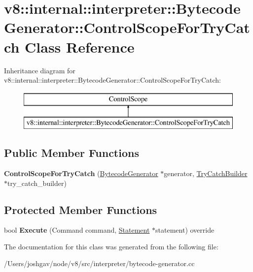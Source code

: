 \hypertarget{classv8_1_1internal_1_1interpreter_1_1_bytecode_generator_1_1_control_scope_for_try_catch}{}\section{v8\+:\+:internal\+:\+:interpreter\+:\+:Bytecode\+Generator\+:\+:Control\+Scope\+For\+Try\+Catch Class Reference}
\label{classv8_1_1internal_1_1interpreter_1_1_bytecode_generator_1_1_control_scope_for_try_catch}
Inheritance diagram for v8\+:\+:internal\+:\+:interpreter\+:\+:Bytecode\+Generator\+:\+:Control\+Scope\+For\+Try\+Catch\+:\begin{figure}[H]
\begin{center}
\leavevmode
\includegraphics[height=2.000000cm]{classv8_1_1internal_1_1interpreter_1_1_bytecode_generator_1_1_control_scope_for_try_catch}
\end{center}
\end{figure}
\subsection*{Public Member Functions}
\begin{DoxyCompactItemize}
\item 
{\bfseries Control\+Scope\+For\+Try\+Catch} (\hyperlink{classv8_1_1internal_1_1interpreter_1_1_bytecode_generator}{Bytecode\+Generator} $\ast$generator, \hyperlink{classv8_1_1internal_1_1interpreter_1_1_try_catch_builder}{Try\+Catch\+Builder} $\ast$try\+\_\+catch\+\_\+builder)\hypertarget{classv8_1_1internal_1_1interpreter_1_1_bytecode_generator_1_1_control_scope_for_try_catch_a55f86d5cd0c6b4be2abbdf58fac2a5e3}{}\label{classv8_1_1internal_1_1interpreter_1_1_bytecode_generator_1_1_control_scope_for_try_catch_a55f86d5cd0c6b4be2abbdf58fac2a5e3}

\end{DoxyCompactItemize}
\subsection*{Protected Member Functions}
\begin{DoxyCompactItemize}
\item 
bool {\bfseries Execute} (Command command, \hyperlink{classv8_1_1internal_1_1_statement}{Statement} $\ast$statement) override\hypertarget{classv8_1_1internal_1_1interpreter_1_1_bytecode_generator_1_1_control_scope_for_try_catch_a0bea68d69c102af73fa819ba9add9da7}{}\label{classv8_1_1internal_1_1interpreter_1_1_bytecode_generator_1_1_control_scope_for_try_catch_a0bea68d69c102af73fa819ba9add9da7}

\end{DoxyCompactItemize}


The documentation for this class was generated from the following file\+:\begin{DoxyCompactItemize}
\item 
/\+Users/joshgav/node/v8/src/interpreter/bytecode-\/generator.\+cc\end{DoxyCompactItemize}
